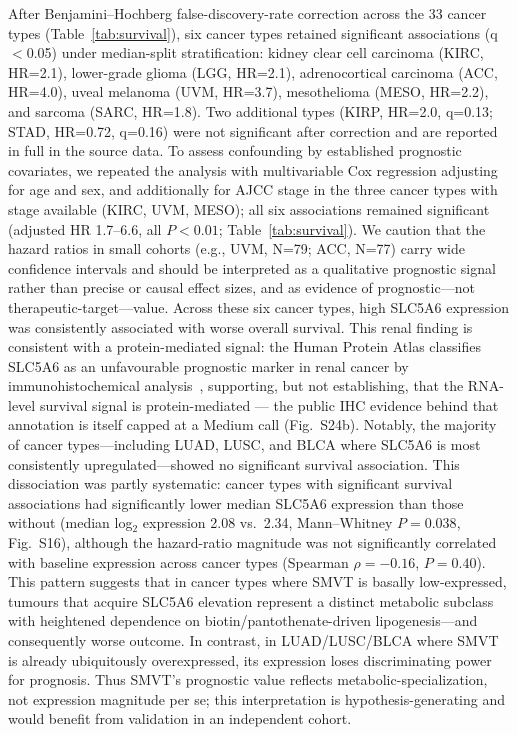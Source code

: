 \documentclass[pdflatex,sn-nature]{sn-jnl}
\begin{document}
After Benjamini--Hochberg false-discovery-rate correction across the 33 cancer types (Table~\ref{tab:survival}), six cancer types retained significant associations (q$<$0.05) under median-split stratification: kidney clear cell carcinoma (KIRC, HR=2.1), lower-grade glioma (LGG, HR=2.1), adrenocortical carcinoma (ACC, HR=4.0), uveal melanoma (UVM, HR=3.7), mesothelioma (MESO, HR=2.2), and sarcoma (SARC, HR=1.8). Two additional types (KIRP, HR=2.0, q=0.13; STAD, HR=0.72, q=0.16) were not significant after correction and are reported in full in the source data. To assess confounding by established prognostic covariates, we repeated the analysis with multivariable Cox regression adjusting for age and sex, and additionally for AJCC stage in the three cancer types with stage available (KIRC, UVM, MESO); all six associations remained significant (adjusted HR 1.7--6.6, all $P<0.01$; Table~\ref{tab:survival}). We caution that the hazard ratios in small cohorts (e.g., UVM, N=79; ACC, N=77) carry wide confidence intervals and should be interpreted as a qualitative prognostic signal rather than precise or causal effect sizes, and as evidence of prognostic---not therapeutic-target---value. Across these six cancer types, high SLC5A6 expression was consistently associated with worse overall survival. This renal finding is consistent with a protein-mediated signal: the Human Protein Atlas classifies SLC5A6 as an unfavourable prognostic marker in renal cancer by immunohistochemical analysis~\cite{uhlens2015}, supporting, but not establishing, that the RNA-level survival signal is protein-mediated --- the public IHC evidence behind that annotation is itself capped at a Medium call (Fig.~S24b). Notably, the majority of cancer types---including LUAD, LUSC, and BLCA where SLC5A6 is most consistently upregulated---showed no significant survival association. This dissociation was partly systematic: cancer types with significant survival associations had significantly lower median SLC5A6 expression than those without (median log$_2$ expression 2.08 vs.\ 2.34, Mann--Whitney $P=0.038$, Fig.~S16), although the hazard-ratio magnitude was not significantly correlated with baseline expression across cancer types (Spearman $\rho=-0.16$, $P=0.40$). This pattern suggests that in cancer types where SMVT is basally low-expressed, tumours that acquire SLC5A6 elevation represent a distinct metabolic subclass with heightened dependence on biotin/pantothenate-driven lipogenesis---and consequently worse outcome. In contrast, in LUAD/LUSC/BLCA where SMVT is already ubiquitously overexpressed, its expression loses discriminating power for prognosis. Thus SMVT's prognostic value reflects metabolic-specialization, not expression magnitude per se; this interpretation is hypothesis-generating and would benefit from validation in an independent cohort.
\end{document}

